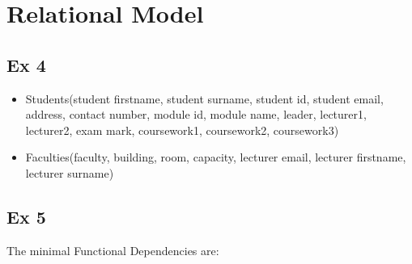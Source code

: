 \section{Relational Model}


\subsection*{Ex 4}

\begin{itemize}
    \item Students(student firstname, student surname, student id, student email, address, contact number, module id, module name, leader, lecturer1, lecturer2, exam mark, coursework1, coursework2, coursework3)
    \item Faculties(faculty, building, room, capacity, lecturer email, lecturer firstname, lecturer surname)
\end{itemize}


\subsection*{Ex 5}

The minimal Functional Dependencies are:

